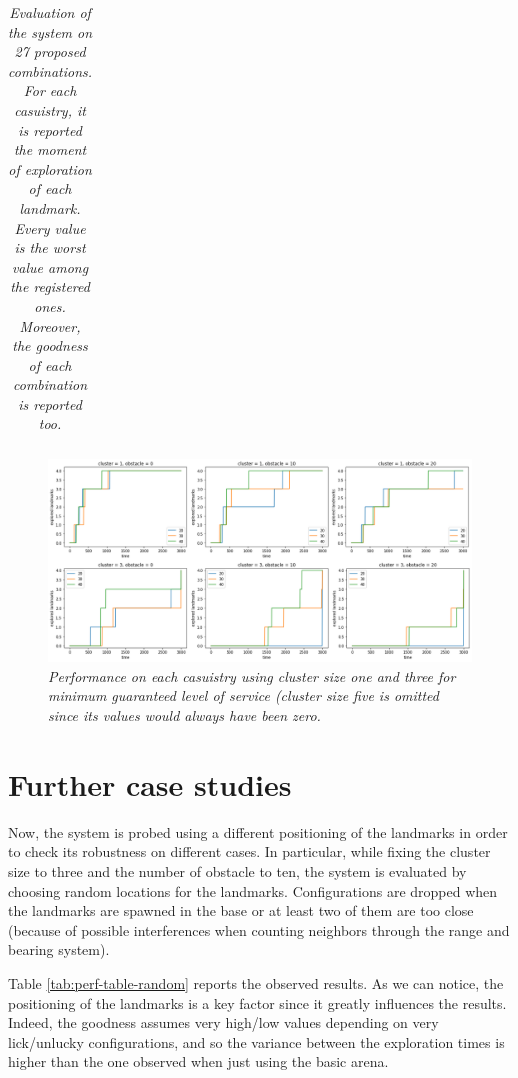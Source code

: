 \begin{table}[H]
\begin{tabular}{| c c c | c c c c | c |}
\end{tabular}
\caption{\label{tab:perf-table}\textit{Evaluation of the system on 27 proposed combinations. For each casuistry, it is reported the moment of exploration of each landmark. Every value is the worst value among the registered ones. Moreover, the goodness of each combination is reported too.}}
\end{table}

\begin{figure}[H]
\centering
\includegraphics[width=\linewidth]{images/ts_all.png}
\caption{\textit{Performance on each casuistry using cluster size one and three for minimum guaranteed level of service (cluster size five is omitted since its values would always have been zero.}}
\label{fig:ts-all}
\end{figure}

\section{Further case studies}

Now, the system is probed using a different positioning of the landmarks in order to check its robustness on different cases. In particular, while fixing the cluster size to three and the number of obstacle to ten, the system is evaluated by choosing random locations for the landmarks. Configurations are dropped when the landmarks are spawned in the base or at least two of them are too close (because of possible interferences when counting neighbors through the range and bearing system). 

\noindent
Table \ref{tab:perf-table-random} reports the observed results. As we can notice, the positioning of the landmarks is a key factor since it greatly influences the results. Indeed, the goodness assumes very high/low values depending on very lick/unlucky configurations, and so the variance between the exploration times is higher than the one observed when just using the basic arena. 


